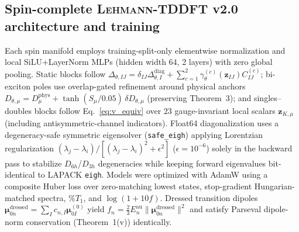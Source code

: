 \documentclass[10pt,twocolumn]{article}
\theoremstyle{natthm}
\newcommand{\leh}{\textsc{Lehmann-TDDFT}}
\newcommand{\pctT}{\mathrm{\%}T_1}
\begin{document}
\subsection*{Spin-complete \leh{} v2.0 architecture and training}
Each spin manifold employs training-split-only elementwise normalization and local SiLU+LayerNorm MLPs (hidden width $64$, 2 layers) with zero global pooling.
Static blocks follow $\Delta_{\theta,IJ}=\delta_{IJ}\Delta_{\theta,I}^{\mathrm{diag}}+\sum_{c=1}^{2}\gamma_\theta^{(c)}(\mathbf{z}_{IJ})C_{IJ}^{(c)}$; bi-exciton poles use overlap-gated refinement around physical anchors $D_{\theta,\mu}=D_\mu^{\mathrm{phys}}+\tanh(S_\mu/0.05)\,\delta D_{\theta,\mu}$ (preserving Theorem~3); and singles--doubles blocks follow Eq.~\eqref{eq:v_equiv} over 23 gauge-invariant local scalars $\mathbf{z}_{K,\mu}$ (including antisymmetric-channel indicators).
Float64 diagonalization uses a degeneracy-safe symmetric eigensolver (\texttt{safe\_eigh}) applying Lorentzian regularization $(\lambda_j-\lambda_i)/[(\lambda_j-\lambda_i)^2+\epsilon^2]$ ($\epsilon=10^{-6}$) solely in the backward pass to stabilize $D_{6h}$/$D_{3h}$ degeneracies while keeping forward eigenvalues bit-identical to LAPACK \texttt{eigh}.
Models were optimized with AdamW\cite{loshchilov2019adamw} using a composite Huber loss over zero-matching lowest states, stop-gradient Hungarian-matched spectra, $\pctT$, and $\log(1+10f)$.
Dressed transition dipoles $\boldsymbol{\mu}_{0n}^{\mathrm{dressed}}=\sum_I c_{n,I}\boldsymbol{\mu}_{0I}^{(0)}$ yield $f_n=\frac{2}{3}E_n^{\mathrm{au}}\|\boldsymbol{\mu}_{0n}^{\mathrm{dressed}}\|^2$ and satisfy Parseval dipole-norm conservation (Theorem~1(v)) identically.
\end{document}
